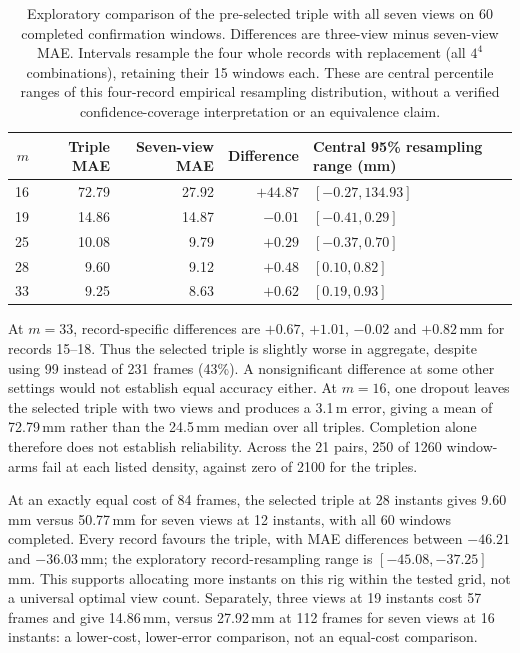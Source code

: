 \documentclass{iopjournal}
\begin{document}
\begin{table}
\caption{Exploratory comparison of the pre-selected triple with all seven
views on 60 completed confirmation windows. Differences are three-view minus
seven-view MAE. Intervals resample the four whole records with replacement
(all $4^4$ combinations), retaining their 15 windows each. These are central percentile ranges of this four-record empirical
resampling distribution, without a verified confidence-coverage interpretation
or an equivalence claim.}
\centering
\begin{tabular}{rrrrl}
\hline
$m$ & Triple MAE & Seven-view MAE & Difference & Central 95\% resampling range (mm)\\
\hline
16 & 72.79 & 27.92 & $+44.87$ & $[-0.27,134.93]$\\
19 & 14.86 & 14.87 & $-0.01$ & $[-0.41,0.29]$\\
25 & 10.08 & 9.79 & $+0.29$ & $[-0.37,0.70]$\\
28 & 9.60 & 9.12 & $+0.48$ & $[0.10,0.82]$\\
33 & 9.25 & 8.63 & $+0.62$ & $[0.19,0.93]$\\
\hline
\end{tabular}
\label{tab:recordpairs}
\end{table}

At $m=33$, record-specific differences are $+0.67$, $+1.01$, $-0.02$ and
$+0.82$\,mm for records 15--18. Thus the selected triple is slightly worse
in aggregate, despite using 99 instead of 231 frames (43\%). A nonsignificant
difference at some other settings would not establish equal accuracy either.
At $m=16$, one dropout leaves the selected triple with two views and produces
a 3.1\,m error, giving a mean of 72.79\,mm rather than the 24.5\,mm median
over all triples. Completion alone therefore does not establish reliability.
Across the 21 pairs, 250 of 1260 window-arms fail at each listed density,
against zero of 2100 for the triples.

At an exactly equal cost of 84 frames, the selected triple at 28 instants
gives 9.60\,mm versus 50.77\,mm for seven views at 12 instants, with all
60 windows completed. Every record favours the triple, with MAE differences
between $-46.21$ and $-36.03$\,mm; the exploratory record-resampling range
is $[-45.08,-37.25]$\,mm. This supports allocating more instants on this
rig within the tested grid, not a universal optimal view count. Separately,
three views at 19 instants cost 57 frames and give 14.86\,mm, versus
27.92\,mm at 112 frames for seven views at 16 instants: a lower-cost,
lower-error comparison, not an equal-cost comparison.
\end{document}
